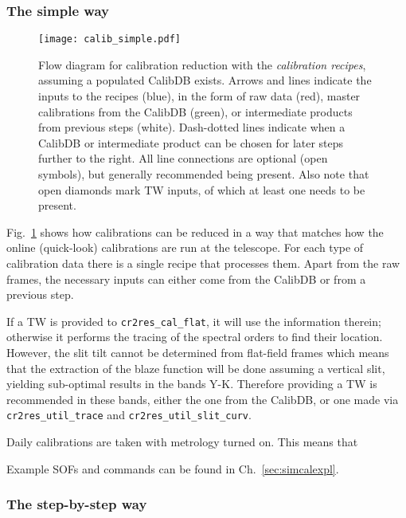 \subsubsection{The simple way}
\label{sec:simplecalib}
\begin{figure}[!tb]
    \begin{center}
        \texttt{[image: calib\_simple.pdf]}
    \end{center}
    \caption{
        \label{fig:calibflow_simple}
        Flow diagram for calibration reduction with the \textit{calibration
        recipes}, assuming a populated CalibDB exists. Arrows and lines indicate
        the inputs to the recipes (blue), in the form of raw data (red), master
        calibrations from the CalibDB (green), or intermediate products from
        previous steps (white). Dash-dotted lines indicate when a CalibDB or
        intermediate product can be chosen for later steps further to the right.
        All line connections are optional (open symbols), but generally
        recommended being present. Also note that open diamonds mark TW inputs,
        of which at least one needs to be present.
    }
\end{figure}

Fig.~\ref{fig:calibflow_simple} shows how calibrations can be reduced in a way
that matches how the online (quick-look) calibrations are run at the telescope.
For each type of calibration data there is a single recipe that processes them.
Apart from the raw frames, the necessary inputs can either come from the CalibDB
or from a previous step.


If a TW is provided to \texttt{cr2res\_cal\_flat}, it will use the information
therein; otherwise it performs the tracing of the spectral orders to find their
location. However, the slit tilt cannot be determined from flat-field frames
which means that the extraction of the blaze function will be done assuming a
vertical slit, yielding sub-optimal results in the bands Y-K. Therefore
providing a TW is recommended in these bands, either the one from the CalibDB,
or one made via \texttt{cr2res\_util\_trace} and
\texttt{cr2res\_util\_slit\_curv}.

Daily calibrations are taken with metrology turned on. This means that 

Example SOFs and commands can be found in Ch.~\ref{sec:simcalexpl}.

\subsubsection{The step-by-step way}
\label{sec:stepcalib}

